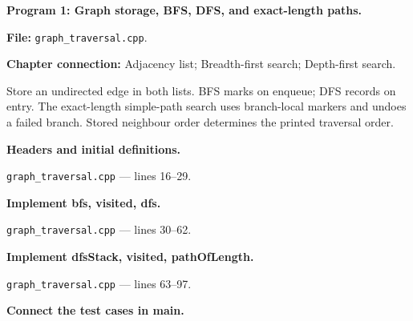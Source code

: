 \textbf{Program 1: Graph storage, BFS, DFS, and exact-length paths.}

\textbf{File:} \texttt{graph\_traversal.cpp}.

\textbf{Chapter connection:} Adjacency list; Breadth-first search; Depth-first search.

Store an undirected edge in both lists. BFS marks on enqueue; DFS records on entry. The exact-length simple-path search uses branch-local markers and undoes a failed branch. Stored neighbour order determines the printed traversal order.



\begin{utpsteps}\setcounter{enumi}{0}\item \textbf{Headers and initial definitions.}\end{utpsteps}

\texttt{graph\_traversal.cpp} --- lines 16--29.




\tcbbreak

\begin{utpsteps}\setcounter{enumi}{1}\item \textbf{Implement bfs, visited, dfs.}\end{utpsteps}

\texttt{graph\_traversal.cpp} --- lines 30--62.






\tcbbreak

\begin{utpsteps}\setcounter{enumi}{2}\item \textbf{Implement dfsStack, visited, pathOfLength.}\end{utpsteps}

\texttt{graph\_traversal.cpp} --- lines 63--97.






\tcbbreak

\begin{utpsteps}\setcounter{enumi}{3}\item \textbf{Connect the test cases in main.}\end{utpsteps}

